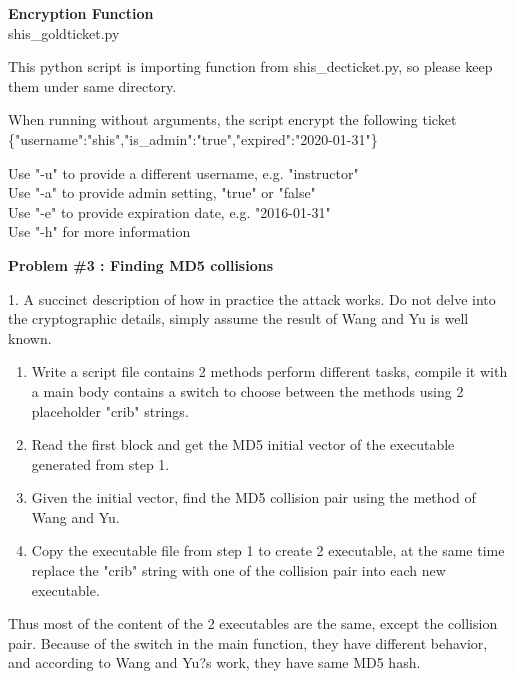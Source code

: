 \documentclass[12pt]{article}  %
\begin{document}
{\bf Encryption Function}\\
shis\_goldticket.py

This python script is importing function from shis\_decticket.py,
so please keep them under same directory.

When running without arguments, the script encrypt the following ticket
\{"username":"shis","is\_admin":"true","expired":"2020-01-31"\}

Use "-u" to provide a different username, e.g. "instructor"\\
Use "-a" to provide admin setting, "true" or "false"\\
Use "-e" to provide expiration date, e.g. "2016-01-31"\\
Use "-h" for more information\\

\newpage
\begin{center}
\textbf{Problem \#3 : Finding MD5 collisions}
\end{center}

1. A succinct description of how in practice the attack works. Do not delve into the cryptographic details, simply assume the result of Wang and Yu is well known.\\
\begin{enumerate}
\item Write a script file contains 2 methods perform different tasks, compile it with a main body contains a switch to choose between the methods using 2 placeholder "crib" strings.\\
\item Read the first block and get the MD5 initial vector of the executable generated from step 1.\\
\item Given the initial vector, find the MD5 collision pair using the method of Wang and Yu.\\
\item Copy the executable file from step 1 to create 2 executable, at the same time replace the "crib" string with one of the collision pair into each new executable. \\
\end{enumerate}
Thus most of the content of the 2 executables are the same, except the collision pair. Because of the switch in the main function, they have different behavior, and according to Wang and Yu?s work, they have same MD5 hash.\\
\end{document}
